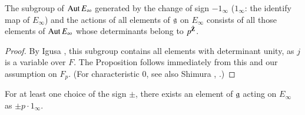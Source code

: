 \begin{subprop}[Igusa]\label{art6-subprop1.1.2}
The subgroup of $\operatorname{Aut} E_\infty$ generated by the change of sign $-1_\infty$ ($1_\infty$: the identify map of $E_\infty$) and the actions of all elements of $\mathfrak{g}$ on $E_\infty$ consists of all those elements of $\operatorname{Aut} E_\infty$ whose determinants belong to $p^{\hat{\mathbf{Z}}}$.
\end{subprop}

\begin{proof}
By Igusa \cite{art6-key5}, this subgroup contains all elements with determinant unity, as $j$ is a variable over $F$. The Proposition follows immediately from this and our assumption on $F_p$. (For characteristic 0, see also Shimura \cite{art6-key17}, \cite{art6-key18}.)
\end{proof}

\begin{coro*}
For at least one choice of the sign $\pm$, there exists an element of $\mathfrak{g}$ acting on $E_\infty$ as $\pm p \cdot 1_\infty$.
\end{coro*}

